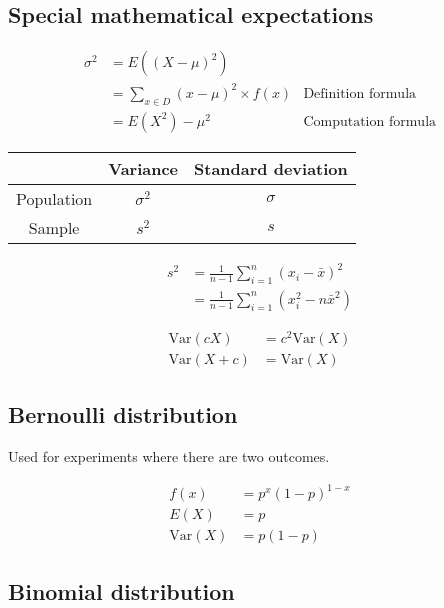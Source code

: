\documentclass{article}
\newcommand{\var}{\text{Var}}
\begin{document}
\begin{multicols*}{2}
\subsection{Special mathematical expectations}

\begin{align*}
    \sigma^2 &= E((X - \mu)^2) \\
    &= \sum_{x \in D} (x - \mu)^2 \times f(x) & \text{Definition formula} \\
    &= E(X^2) - \mu^2 & \text{Computation formula}
\end{align*}

\begin{center}
    \begin{tabular}{|c|c|c|}
        \hline
        & Variance & Standard deviation \\ \hline
        Population & $\sigma^2$ & $\sigma$ \\ \hline
        Sample & $s^2$ & $s$ \\ \hline
    \end{tabular}
\end{center}

\begin{align*}
    s^2 &= \frac{1}{n - 1} \sum_{i = 1}^n (x_i - \bar{x})^2 \\
    &= \frac{1}{n - 1} \sum_{i = 1}^n (x_i^2 - n\bar{x}^2)
\end{align*}

\begin{align*}
    \var(cX) &= c^2 \var(X) \\
    \var(X + c) &= \var(X)
\end{align*}

\subsection{Bernoulli distribution}

Used for experiments where there are two outcomes.

\begin{align*}
    f(x) &= p^x (1-p)^{1-x} \\
    E(X) &= p \\
    \var(X) &= p(1-p)
\end{align*}

\subsection{Binomial distribution}


\end{multicols*}
\end{document}
